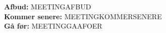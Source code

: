 \textbf{Afbud:} MEETINGAFBUD\\
\textbf{Kommer senere:} MEETINGKOMMERSENERE\\
\textbf{Gå før:} MEETINGGAAFOER\\
